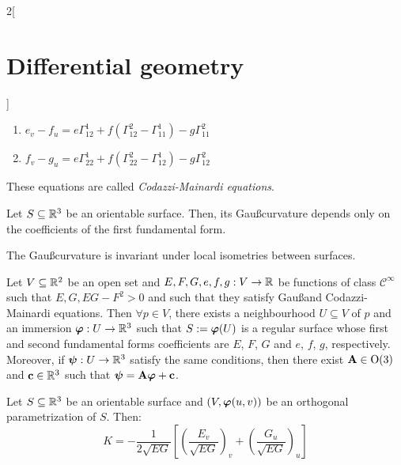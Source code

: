 \documentclass[../../../main.tex]{subfiles}
\begin{document}
\begin{multicols}{2}[\section{Differential geometry}]
\begin{proposition}
\begin{enumerate}
      \item $\displaystyle e_v-f_u=e\Gamma_{12}^1+f\left(\Gamma_{12}^2-\Gamma_{11}^1\right)-g\Gamma_{11}^2$
      \item $\displaystyle f_v-g_u=e\Gamma_{22}^1+f\left(\Gamma_{22}^2-\Gamma_{12}^1\right)-g\Gamma_{12}^2$
    \end{enumerate}
    These equations are called \emph{Codazzi-Mainardi equations}.
  \end{proposition}
  \begin{corollary}
    Let $S\subseteq\mathbb{R}^3$ be an orientable surface. Then, its Gau\ss\space curvature depends only on the coefficients of the first fundamental form.
  \end{corollary}
  \begin{theorem}
    The Gau\ss\space curvature is invariant under local isometries between surfaces.
  \end{theorem}
  \begin{theorem}
    Let $V\subseteq\mathbb{R}^2$ be an open set and $E,F,G,e,f,g:V\rightarrow\mathbb{R}$ be functions of class $\mathcal{C}^\infty$ such that $E,G,EG-F^2>0$ and such that they satisfy Gau\ss\space and Codazzi-Mainardi equations. Then $\forall p\in V$, there exists a neighbourhood $U\subseteq V$ of $p$ and an immersion $\boldsymbol{\mathrm{\varphi}}:U\rightarrow\mathbb{R}^3$ such that $S:=\boldsymbol{\mathrm{\varphi}}(U)$ is a regular surface whose first and second fundamental forms coefficients are $E$, $F$, $G$ and $e$, $f$, $g$, respectively. Moreover, if $\boldsymbol{\mathrm{\psi}}:U\rightarrow\mathbb{R}^3$ satisfy the same conditions, then there exist $\boldsymbol{\mathrm{A}}\in\text{O}(3)$ and $\boldsymbol{\mathrm{c}}\in\mathbb{R}^3$ such that $\boldsymbol{\mathrm{\psi}}=\boldsymbol{\mathrm{A\varphi}}+\boldsymbol{\mathrm{c}}$.
  \end{theorem}
  \begin{proposition}
    Let $S\subseteq\mathbb{R}^3$ be an orientable surface and $(V,\boldsymbol{\mathrm{\varphi}}(u,v))$ be an orthogonal parametrization of $S$. Then: $$K=-\frac{1}{2\sqrt{EG}}\left[{\left(\frac{E_v}{\sqrt{EG}}\right)}_v+{\left(\frac{G_u}{\sqrt{EG}}\right)}_u\right]$$
  \end{proposition}

\end{multicols}
\end{document}
